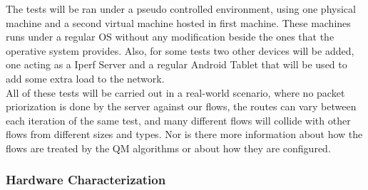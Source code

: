The tests will be ran under a pseudo controlled environment, using one physical 
machine and a second virtual machine hosted in first machine. These machines 
runs under a regular OS without any modification beside the ones that the 
operative system provides. Also, for some tests two other devices will be added, 
one acting as a Iperf Server and a regular Android Tablet that will be used to 
add some extra load to the network.\\

All of these tests will be carried out in a real-world scenario, where no packet 
priorization is done by the server against our flows, the routes can vary
between each iteration of the same test, and many different flows will collide
with other flows from different sizes and types. Nor is there more information 
about how the flows are treated by the QM algorithms or about how they are 
configured.\\


\subsubsection{Hardware Characterization}

